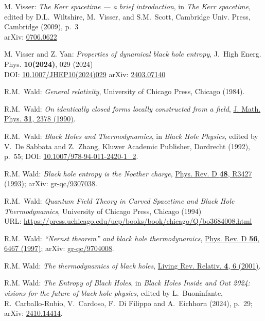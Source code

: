 \begin{thebibliography}{123}
M. Visser: {\em The Kerr spacetime --- a brief introduction},
in {\em The Kerr spacetime}, edited by D.L.~Wiltshire, M.~Visser, and S.M.~Scott,
Cambridge Univ. Press, Cambridge (2009), p.~3\\
arXiv: \href{https://arxiv.org/abs/0706.0622}{0706.0622}

M. Visser and Z. Yan:
{\em Properties of dynamical black hole entropy},
J.~High Energ. Phys. {\bf 10(2024)}, 029 (2024)\\
DOI: \href{https://doi.org/10.1007/JHEP10(2024)029}{10.1007/JHEP10(2024)029}\hfill
arXiv: \href{https://arxiv.org/abs/2403.07140}{2403.07140}

R.M.~Wald:
{\em General relativity},
University of Chicago Press, Chicago (1984).

R.M.~Wald:
{\em On identically closed forms locally constructed from a field},
\href{https://doi.org/10.1063/1.528839}{J. Math. Phys. {\bf 31}, 2378 (1990)}.

R.M.~Wald:
{\em Black Holes and Thermodynamics},
in {\em Black Hole Physics}, edited by V.~De Sabbata and Z.~Zhang,
Kluwer Academic Publisher, Dordrecht (1992), p.~55;
DOI: \href{https://doi.org/10.1007/978-94-011-2420-1_2}{10.1007/978-94-011-2420-1\_2}.

R.M. Wald:
{\em Black hole entropy is the Noether charge},
\href{https://doi.org/10.1103/PhysRevD.48.R3427}{Phys. Rev. D {\bf 48}, R3427 (1993)};
arXiv: \href{https://arxiv.org/abs/gr-qc/9307038}{gr-qc/9307038}.

R.M.~Wald:
{\em Quantum Field Theory in Curved Spacetime and Black Hole Thermodynamics},
University of Chicago Press, Chicago (1994)\\
URL: \url{https://press.uchicago.edu/ucp/books/book/chicago/Q/bo3684008.html}

R.M.~Wald:
{\em ``Nernst theorem'' and black hole thermodynamics},
\href{https://doi.org/10.1103/PhysRevD.56.6467}{Phys. Rev. D {\bf 56}, 6467 (1997)};
arXiv: \href{https://arxiv.org/abs/gr-qc/9704008}{gr-qc/9704008}.

R.M. Wald: {\em The thermodynamics of black holes},
\href{https://doi.org/10.12942/lrr-2001-6}{Living Rev. Relativ. {\bf 4}, 6 (2001)}.

R.M. Wald: {\em The Entropy of Black Holes},
in {\em Black Holes Inside and Out 2024: visions for the future of black hole physics},
edited by L.~Buoninfante, R.~Carballo-Rubio, V.~Cardoso, F.~Di Filippo and A.~Eichhorn
(2024), p.~29;
arXiv: \href{https://arxiv.org/abs/2410.14414}{2410.14414}.


\end{thebibliography}
